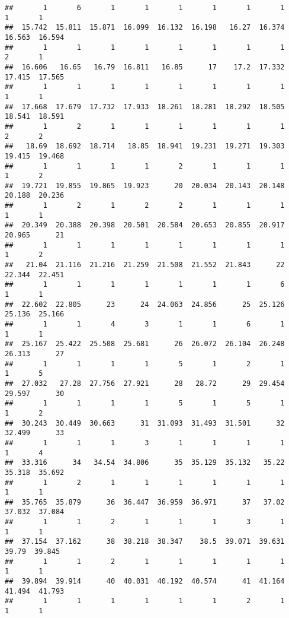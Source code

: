 \documentclass[]{article}
\begin{document}
\begin{verbatim}
##       1       6       1       1       1       1       1       1       1       1 
##  15.742  15.811  15.871  16.099  16.132  16.198   16.27  16.374  16.563  16.594 
##       1       1       1       1       1       1       1       1       2       1 
##  16.606   16.65   16.79  16.811   16.85      17    17.2  17.332  17.415  17.565 
##       1       1       1       1       1       1       1       1       1       1 
##  17.668  17.679  17.732  17.933  18.261  18.281  18.292  18.505  18.541  18.591 
##       1       2       1       1       1       1       1       1       2       2 
##   18.69  18.692  18.714   18.85  18.941  19.231  19.271  19.303  19.415  19.468 
##       1       1       1       1       2       1       1       1       1       2 
##  19.721  19.855  19.865  19.923      20  20.034  20.143  20.148  20.188  20.236 
##       1       2       1       2       2       1       1       1       1       1 
##  20.349  20.388  20.398  20.501  20.584  20.653  20.855  20.917  20.965      21 
##       1       1       1       1       1       1       1       1       1       2 
##   21.04  21.116  21.216  21.259  21.508  21.552  21.843      22  22.344  22.451 
##       1       1       1       1       1       1       1       6       1       1 
##  22.602  22.805      23      24  24.063  24.856      25  25.126  25.136  25.166 
##       1       1       4       3       1       1       6       1       1       1 
##  25.167  25.422  25.508  25.681      26  26.072  26.104  26.248  26.313      27 
##       1       1       1       1       5       1       2       1       1       5 
##  27.032   27.28  27.756  27.921      28   28.72      29  29.454  29.597      30 
##       1       1       1       1       5       1       5       1       1       2 
##  30.243  30.449  30.663      31  31.093  31.493  31.501      32  32.499      33 
##       1       1       1       3       1       1       1       1       1       4 
##  33.316      34   34.54  34.806      35  35.129  35.132   35.22  35.318  35.692 
##       1       2       1       1       1       1       1       1       1       1 
##  35.765  35.879      36  36.447  36.959  36.971      37   37.02  37.032  37.084 
##       1       1       2       1       1       1       3       1       1       1 
##  37.154  37.162      38  38.218  38.347    38.5  39.071  39.631   39.79  39.845 
##       1       1       2       1       1       1       1       1       1       1 
##  39.894  39.914      40  40.031  40.192  40.574      41  41.164  41.494  41.793 
##       1       1       1       1       1       1       2       1       1       1 

\end{verbatim}
\end{document}

